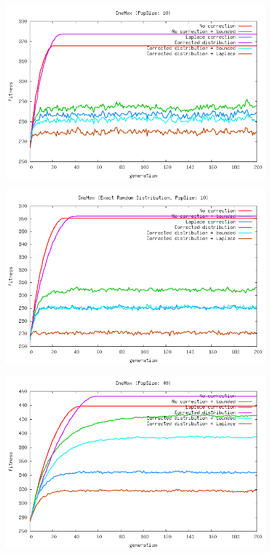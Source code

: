 \documentclass[a4paper,twoside]{report}
\begin{document}
\begin{figure}[htp]
\includegraphics[scale=0.5]{graph_onemax000_fitness.png}
\end{figure}
\begin{figure}[htp]
\includegraphics[scale=0.5]{graph_onemax001_fitness.png}
\end{figure}
\begin{figure}[htp]
\includegraphics[scale=0.5]{graph_onemax002_fitness.png}
\end{figure}
\end{document}
